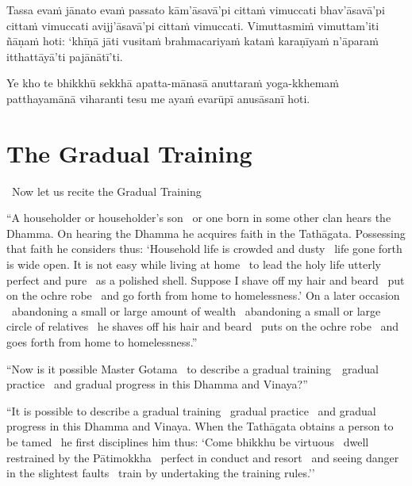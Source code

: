 Tassa evaṁ jānato evaṁ passato kām'āsavā'pi cittaṁ vimuccati bhav'āsavā'pi cittaṁ vimuccati avijj'āsavā'pi cittaṁ vimuccati. Vimuttasmiṁ vimuttam'iti ñāṇaṁ hoti: `khīṇā jāti vusitaṁ brahmacariyaṁ kataṁ karaṇīyaṁ n'āparaṁ itthattāyā'ti pajānātī'ti.

\suttaRef{[MN 39]}

Ye kho te bhikkhū sekkhā apatta-mānasā anuttaraṁ yoga-kkhemaṁ patthayamānā viharanti tesu me ayaṁ evarūpī anusāsanī hoti.

\suttaRef{[MN 107]}

\section{The Gradual Training}
\label{gradual-training}

\begin{leader-english}
  \anglebracketleft\ \hspace{-0.5mm}Now let us recite the Gradual Training \hspace{-0.5mm}\anglebracketright\
\end{leader-english}
\begin{english-only-justify}
  ``A householder or householder's son \breathmark\ or one born in some other clan hears the Dhamma. On hearing the Dhamma he acquires faith in the Tathāgata. Possessing that faith he considers thus: `Household life is crowded and dusty \breathmark\ life gone forth is wide open. It is not easy while living at home \breathmark\ to lead the holy life utterly perfect and pure \breathmark\ as a polished shell. Suppose I shave off my hair and beard \breathmark\ put on the ochre robe \breathmark\ and go forth from home to homelessness.' On a later occasion \breathmark\ abandoning a small or large amount of wealth \breathmark\ abandoning a small or large circle of relatives \breathmark\ he shaves off his hair and beard \breathmark\ puts on the ochre robe \breathmark\ and goes forth from home to homelessness.''
\end{english-only-justify}

\suttaRef{[MN 27 / 38 / 51]}

\begin{english-only-justify}
  ``Now is it possible Master Gotama \breathmark\ to describe a gradual \mbox{training}~\breathmark\ gradual practice \breathmark\ and gradual progress in this Dhamma and Vinaya?''
\end{english-only-justify}

\begin{english-only-justify}
  ``It is possible to describe a gradual training \breathmark\ gradual practice \breathmark\ and gradual progress in this Dhamma and Vinaya. When the Tathāgata obtains a person to be tamed \breathmark\ he first disciplines him thus: `Come bhikkhu be virtuous \breathmark\ dwell restrained by the Pātimokkha \breathmark\ perfect in conduct and resort \breathmark\ and seeing danger in the slightest faults \breathmark\ train by undertaking the training rules.''
\end{english-only-justify}

